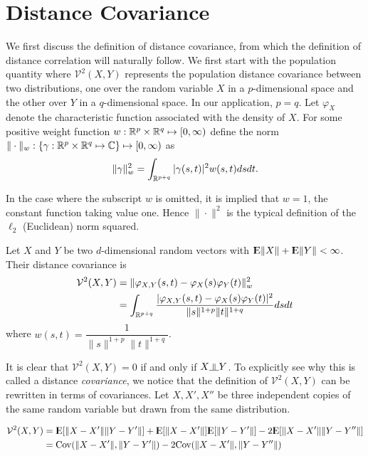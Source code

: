 \section{Distance Covariance}

We first discuss the definition of distance covariance, from which the
definition of distance correlation will naturally follow. We first start
with the population quantity where $\mathcal{V}^2(X,Y)$ represents the
population distance covariance between two distributions, one over the
random variable $X$ in a $p$-dimensional space and the other over $Y$ in
a $q$-dimensional space. In our application, $p=q$. Let $\varphi_X$
denote the characteristic function associated with the density of $X$.
For some positive weight function
$w : \mathbb{R}^p \times \mathbb{R}^q \mapsto [0, \infty)$ define the norm
$\|\cdot\|_w : \{\gamma : \mathbb{R}^p \times \mathbb{R}^q \mapsto \mathbb{C}\}
               \mapsto [0, \infty)$ as
$$ \| \gamma \|_w^2 = \int_{\mathbb{R}^{p+q}} | \gamma(s,t) |^2 w(s,t) ds dt. $$

In the case where the subscript $w$ is omitted, it is implied that
$w = 1$, the constant function taking value one. Hence $\| \cdot \|^2$
is the typical definition of the $\ell_2$ (Euclidean) norm squared.

\begin{definition} 
Let $X$ and $Y$ be two $d$-dimensional random
vectors with ${\rm I\kern-.3em E}\|X\| + {\rm I\kern-.3em E}\|Y\| < \infty$. Their distance
covariance is
\begin{align*}
\mathcal{V}^2 (X,Y)
&= \| \varphi_{X,Y}(s,t) - \varphi_X(s)\varphi_Y(t) \|_w^2 \\
&= \int_{\mathbb{R}^{p+q}} \dfrac{|\varphi_{X,Y}(s,t) -
                           \varphi_X(s)\varphi_Y(t)|^2}
                         {\|s\|^{1+p} \|t\|^{1+q}} ds dt
\end{align*}
where $w(s,t) = \dfrac{1}{\|s\|^{1+p} \|t\|^{1+q}}$.
\end{definition}

It is clear that $\mathcal{V}^2(X,Y) = 0$ if and only if  $X \indep Y$.
To explicitly see why this is called a distance \emph{covariance}, we
notice that the definition of $\mathcal{V}^2(X,Y)$ can be rewritten in
terms of covariances. Let $X, X', X''$ be three independent copies of
the same random variable but drawn from the same distribution.

\begin{prop} \label{prop:cov}
\begin{align*}
\mathcal{V}^2 (X,Y)
&= {\rm I\kern-.3em E}[\|X - X'\| \|Y - Y'\|]
 + {\rm I\kern-.3em E}[\|X - X'\|] {\rm I\kern-.3em E}[\|Y - Y'\|]
 - 2 {\rm I\kern-.3em E}[ \|X - X'\| \|Y - Y''\| ] \\
&= \mathrm{Cov}( \|X - X'\|, \|Y - Y'\| ) - 2 \mathrm{Cov} (\|X - X'\|, \|Y - Y''\| ) 
\end{align*}
\end{prop}

